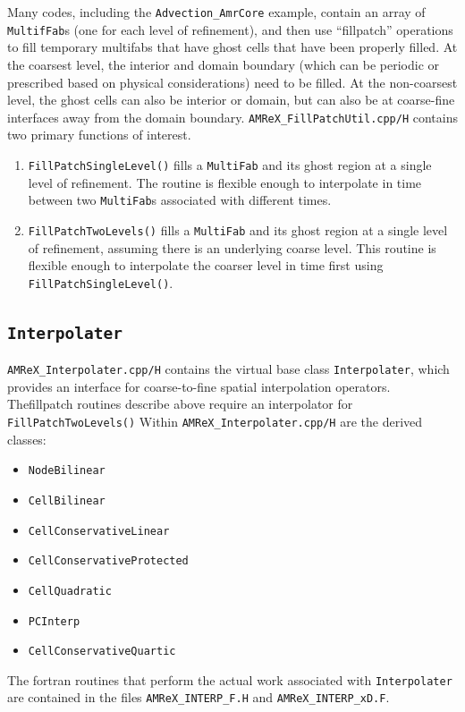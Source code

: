 Many codes, including the {\tt Advection\_AmrCore} example, contain an array of {\tt MultifFab}s
(one for each level of refinement), and then use ``fillpatch'' operations to fill temporary
multifabs that have ghost cells that have been properly filled.  At the coarsest level,
the interior and domain boundary (which can be periodic or prescribed based on physical considerations)
need to be filled.  At the non-coarsest level, the ghost cells can also be interior or domain,
but can also be at coarse-fine interfaces away from the domain boundary.
{\tt AMReX\_FillPatchUtil.cpp/H} contains two primary functions of interest.
\begin{enumerate}
\item {\tt FillPatchSingleLevel()} fills a {\tt MultiFab} and its ghost region at a single level of 
refinement.  The routine is flexible enough to interpolate in time between two {\tt MultiFab}s
associated with different times.
\item {\tt FillPatchTwoLevels()} fills a {\tt MultiFab} and its ghost region at a single level of 
refinement, assuming there is an underlying coarse level.  This routine is flexible enough to interpolate
the coarser level in time first using {\tt FillPatchSingleLevel()}.
\end{enumerate}

\subsection{{\tt Interpolater}}

{\tt AMReX\_Interpolater.cpp/H} contains the virtual base class {\tt Interpolater}, which provides
an interface for coarse-to-fine spatial interpolation operators.  Thefillpatch routines describe
above require an interpolator for {\tt FillPatchTwoLevels()}
Within {\tt AMReX\_Interpolater.cpp/H} are the derived classes:
\begin{itemize}
\item {\tt NodeBilinear}
\item {\tt CellBilinear}
\item {\tt CellConservativeLinear}
\item {\tt CellConservativeProtected}
\item {\tt CellQuadratic}
\item {\tt PCInterp}
\item {\tt CellConservativeQuartic}
\end{itemize}
The fortran routines that perform the actual work associated with {\tt Interpolater} are 
contained in the files {\tt AMReX\_INTERP\_F.H} and {\tt AMReX\_INTERP\_xD.F}.

